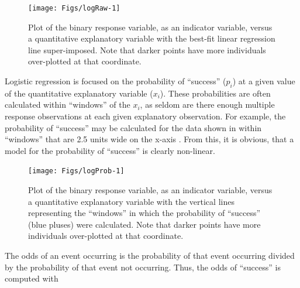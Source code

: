 \documentclass[10pt,openany]{book}\usepackage[]{graphicx}\usepackage[]{color}
\newenvironment{knitrout}{}{} %
\begin{document}
\begin{knitrout}
\color{fgcolor}\begin{figure}[!h]

{\centering \texttt{[image: Figs/logRaw-1]} 

}

\caption[Plot of the binary response variable, as an indicator variable, versus a quantitative explanatory variable with the best-fit linear regression line super-imposed]{Plot of the binary response variable, as an indicator variable, versus a quantitative explanatory variable with the best-fit linear regression line super-imposed.  Note that darker points have more individuals over-plotted at that coordinate.}\label{fig:logRaw}
\end{figure}


\end{knitrout}
\vspace{9pt}
Logistic regression is focused on the probability of ``success'' ($p_{i}$) at a given value of the quantitative explanatory variable ($x_{i}$).  These probabilities are often calculated within ``windows'' of the $x_{i}$, as seldom are there enough multiple response observations at each given explanatory observation.  For example, the probability of ``success'' may be calculated for the data shown in  within ``windows'' that are 2.5 units wide on the x-axis .  From this, it is obvious, that a model for the probability of ``success'' is clearly non-linear.

\begin{knitrout}
\color{fgcolor}\begin{figure}[hbtp]

{\centering \texttt{[image: Figs/logProb-1]} 

}

\caption[Plot of the binary response variable, as an indicator variable, versus a quantitative explanatory variable with the vertical lines representing the ``windows'' in which the probability of ``success'' (blue pluses) were calculated]{Plot of the binary response variable, as an indicator variable, versus a quantitative explanatory variable with the vertical lines representing the ``windows'' in which the probability of ``success'' (blue pluses) were calculated.  Note that darker points have more individuals over-plotted at that coordinate.}\label{fig:logProb}
\end{figure}


\end{knitrout}
\vspace{9pt}
The odds of an event occurring is the probability of that event occurring divided by the probability of that event not occurring.  Thus, the odds of ``success'' is computed with
\end{document}
